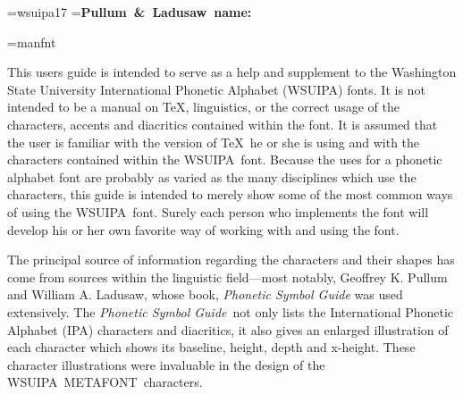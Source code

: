 

\asisformat{\skipbefore{6pt}
            \everyasis{\leftindent{.5in}\rightindent{.5in}\tt}
            \skipafter{6pt}}
\font\smokefont=wsuipa17
\newbox\tagbox
\setbox\tagbox=\hbox{\tenpt\bf Pullum \&\ Ladusaw name:}
 
\font\mf=manfnt
\def\deg{$^\circ$}
 
\def\meta{{\mf METAFONT}}
\def\wsu{{\tenpt WSUIPA}}
\def\ipam{{\tenpt IPAMACS}}
\def\PL{{\it Phonetic Symbol Guide}}
 
\def\pos#1{\vs{10pt}\hrule width 1in\vs{1pt}\hrule width 1in
    \noindent\label{\hfill\tenbf WSUIPA Char' Position:}\rm #1\par}
\def\pl#1{\noindent\label{\hfill\tenbf Pullum \&\ Ladusaw name:}\rm #1\par}
\def\mac#1{\noindent\label{\hfill\tenbf IPAMACS Name:}\tt\char'134 #1\par}
\def\smoke#1{\noindent\label{\hfill\tenbf IPA Character:}
\smokefont\char#1\par}
\fourteenpt
{}
\twelvept
 
 
This users guide is intended to serve as a help and supplement to the
Washington State University International Phonetic Alphabet (\wsu) fonts.
It is not intended to be a manual on \TeX, linguistics, or the correct usage of
the characters, accents and diacritics contained within the font.
It is assumed that the user is familiar with the version of \TeX\ he or she is
using and with the characters contained within the \wsu\ font.
Because the uses for a phonetic alphabet font are probably as varied as the
many disciplines which use the characters, this guide is intended to merely
show some of the most common ways of using the \wsu\ font. Surely each person
who implements the font will develop his or her own favorite way of working with
 and
using the font.
 
The principal
source of information regarding the characters and their shapes has come from
sources within the linguistic field---most
notably, Geoffrey K. Pullum and William A. Ladusaw, whose book, {\it Phonetic
Symbol Guide} was used extensively.
The \PL\  not only lists the International Phonetic Alphabet (IPA) characters
and diacritics, it also
gives an enlarged illustration of each character which shows its baseline,
height, depth and x-height. These character illustrations were invaluable
in the design of the \wsu\ \meta\ characters.
 
